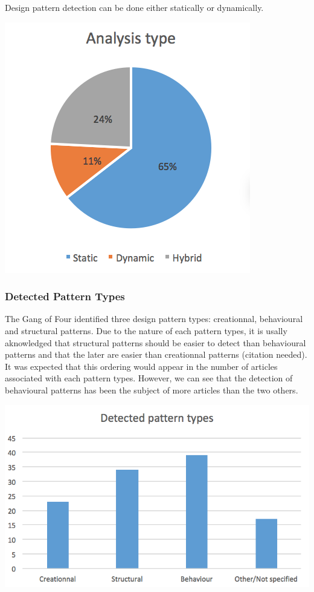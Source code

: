 \documentclass[letterpaper, 10 pt, conference]{ieeeconf}  %
\begin{document}
Design pattern detection can be done either statically or dynamically.


\begin{center}
\includegraphics[scale=0.75]{analysis_type.png}
\end{center}


\subsubsection{Detected Pattern Types}

The Gang of Four identified three design pattern types: creationnal,
behavioural and structural patterns.
Due to the nature of each pattern types, it is usally aknowledged that
structural patterns should be easier to detect than behavioural patterns and
that the later are easier than creationnal patterns (citation needed). 
It was expected that this ordering would appear in the number of articles
associated with each pattern types. 
However, we can see that the detection of behavioural patterns has been the
subject of more articles than the two others.

\begin{center}
  \includegraphics[scale=0.65]{pattern_types.png}
\end{center}
\end{document}
